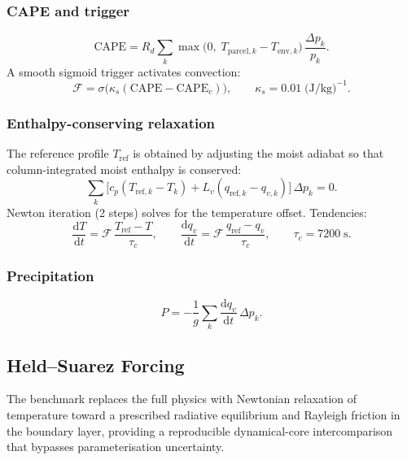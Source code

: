 \documentclass[11pt,a4paper]{article}
\newcommand{\dd}{\mathrm{d}}
\newcommand{\Rd}{R_d}
\newcommand{\cpd}{c_p}
\newcommand{\Lv}{L_v}
\begin{document}
\subsubsection{CAPE and trigger}
\begin{equation}
  \mathrm{CAPE} = \Rd\sum_k \max\!\bigl(0,\;T_{\mathrm{parcel},k}-T_{\mathrm{env},k}\bigr)\,\frac{\Delta p_k}{p_k}.
\end{equation}
A smooth sigmoid trigger activates convection:
\begin{equation}
  \mathcal F = \sigma\!\bigl(\kappa_s(\mathrm{CAPE}-\mathrm{CAPE}_c)\bigr), \qquad \kappa_s=0.01\;\text{(J/kg)}^{-1}.
\end{equation}

\subsubsection{Enthalpy-conserving relaxation}
The reference profile $T_{\mathrm{ref}}$ is obtained by adjusting the moist adiabat so that column-integrated moist enthalpy is conserved:
\begin{equation}
  \sum_k\bigl[\cpd(T_{\mathrm{ref},k}-T_k)+\Lv(q_{\mathrm{ref},k}-q_{v,k})\bigr]\,\Delta p_k = 0.
\end{equation}
Newton iteration (2 steps) solves for the temperature offset.  Tendencies:
\begin{equation}
  \frac{\dd T}{\dd t} = \mathcal F\,\frac{T_{\mathrm{ref}}-T}{\tau_c}, \qquad
  \frac{\dd q_v}{\dd t} = \mathcal F\,\frac{q_{\mathrm{ref}}-q_v}{\tau_c}, \qquad \tau_c=7200\;\text{s}.
\end{equation}

\subsubsection{Precipitation}
\begin{equation}
  P = -\frac{1}{g}\sum_k \frac{\dd q_v}{\dd t}\,\Delta p_k.
\end{equation}

\subsection{Held--Suarez Forcing}

The \citet{HeldSuarez1994} benchmark replaces the full physics with
Newtonian relaxation of temperature toward a prescribed radiative
equilibrium and Rayleigh friction in the boundary layer, providing a
reproducible dynamical-core intercomparison that bypasses
parameterisation uncertainty.
\end{document}
